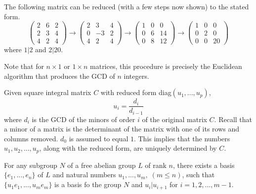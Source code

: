 \documentclass{article}
\begin{document}
    \begin{example}
      The following matrix can be reduced (with a few steps now shown) to the stated form. 
      \begin{equation}
      \begin{pmatrix} 2&6&2 \\ 2&3&4 \\ 4&2&4 \end{pmatrix} \rightarrow 
      \begin{pmatrix} 2&3&4 \\ 0&-3&2 \\ 4&2&4 \end{pmatrix} \rightarrow
      \begin{pmatrix} 1&0&0 \\ 0&6&14 \\ 0&8&12 \end{pmatrix} \rightarrow
      \begin{pmatrix} 1&0&0 \\ 0&2&0 \\ 0&0&20\end{pmatrix}
      \end{equation}
      where $1|2$ and $2|20$. 
    \end{example}

    Note that for $n \times 1$ or $1 \times n$ matrices, this procedure is precisely the Euclidean algorithm that produces the GCD of $n$ integers. 

    \begin{proposition}
      Given square integral matrix $C$ with  reduced form diag$(u_1, ..., u_p)$, 
      \begin{equation}
        u_i = \frac{d_i}{d_{i-1}}
      \end{equation}
      where $d_i$ is the GCD of the minors of order $i$ of the original matrix $C$. Recall that a minor of a matrix is the determinant of the matrix with one of its rows and columns removed. $d_0$ is assumed to equal $1$. This implies that the numbers $u_1, u_2, ..., u_p$, along with the reduced form, are uniquely determined by $C$. 
    \end{proposition}

    \begin{theorem}
      For any subgroup $N$ of a free abelian group $L$ of rank $n$, there exists a basis $\{e_1, ..., e_n\}$ of $L$ and natural numbers $u_1, ..., u_m, \; (m \leq n)$, such that $\{u_1 e_1, ..., u_m e_m\}$ is a basis fo the group $N$ and $u_i | u_{i+1}$ for $i = 1, 2, ..., m-1$. 
    \end{theorem}
\end{document}

